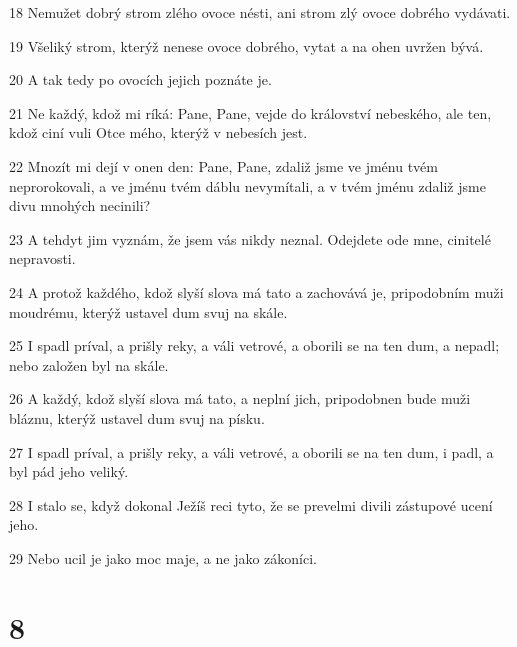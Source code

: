 \par 18 Nemužet dobrý strom zlého ovoce nésti, ani strom zlý ovoce dobrého vydávati.
\par 19 Všeliký strom, kterýž nenese ovoce dobrého, vytat a na ohen uvržen bývá.
\par 20 A tak tedy po ovocích jejich poznáte je.
\par 21 Ne každý, kdož mi ríká: Pane, Pane, vejde do království nebeského, ale ten, kdož ciní vuli Otce mého, kterýž v nebesích jest.
\par 22 Mnozít mi dejí v onen den: Pane, Pane, zdaliž jsme ve jménu tvém neprorokovali, a ve jménu tvém dáblu nevymítali, a v tvém jménu zdaliž jsme divu mnohých necinili?
\par 23 A tehdyt jim vyznám, že jsem vás nikdy neznal. Odejdete ode mne, cinitelé nepravosti.
\par 24 A protož každého, kdož slyší slova má tato a zachovává je, pripodobním muži moudrému, kterýž ustavel dum svuj na skále.
\par 25 I spadl príval, a prišly reky, a váli vetrové, a oborili se na ten dum, a nepadl; nebo založen byl na skále.
\par 26 A každý, kdož slyší slova má tato, a neplní jich, pripodobnen bude muži bláznu, kterýž ustavel dum svuj na písku.
\par 27 I spadl príval, a prišly reky, a váli vetrové, a oborili se na ten dum, i padl, a byl pád jeho veliký.
\par 28 I stalo se, když dokonal Ježíš reci tyto, že se prevelmi divili zástupové ucení jeho.
\par 29 Nebo ucil je jako moc maje, a ne jako zákoníci.

\chapter{8}


